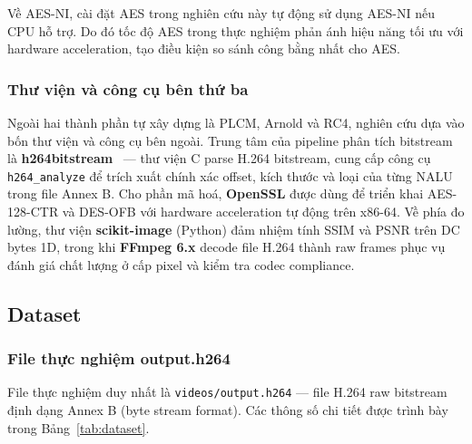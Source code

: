 Về AES-NI, cài đặt AES trong nghiên cứu này tự động sử dụng AES-NI nếu CPU hỗ trợ. Do đó tốc độ AES trong thực nghiệm phản ánh hiệu năng tối ưu với hardware acceleration, tạo điều kiện so sánh công bằng nhất cho AES.

\subsubsection{Thư viện và công cụ bên thứ ba}

Ngoài hai thành phần tự xây dựng là PLCM, Arnold và RC4, nghiên cứu dựa vào bốn thư viện và công cụ bên ngoài. Trung tâm của pipeline phân tích bitstream là \textbf{h264bitstream}~\cite{h264bitstream} --- thư viện C parse H.264 bitstream, cung cấp công cụ \texttt{h264\_analyze} để trích xuất chính xác offset, kích thước và loại của từng NALU trong file Annex B. Cho phần mã hoá, \textbf{OpenSSL} được dùng để triển khai AES-128-CTR và DES-OFB với hardware acceleration tự động trên x86-64. Về phía đo lường, thư viện \textbf{scikit-image} (Python) đảm nhiệm tính SSIM và PSNR trên DC bytes 1D, trong khi \textbf{FFmpeg 6.x} decode file H.264 thành raw frames phục vụ đánh giá chất lượng ở cấp pixel và kiểm tra codec compliance.

\subsection{Dataset}

\subsubsection{File thực nghiệm output.h264}

File thực nghiệm duy nhất là \texttt{videos/output.h264} --- file H.264 raw bitstream định dạng Annex B (byte stream format). Các thông số chi tiết được trình bày trong Bảng~\ref{tab:dataset}.

